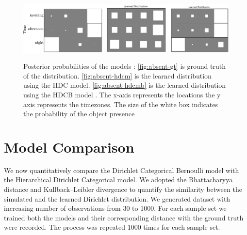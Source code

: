 \begin{figure}
    \centering
    \includegraphics[width=\textwidth]{images/absent_learned.png}
       
    \begin{minipage}[t]{.35\textwidth}
    \label{fig:absent-gt}
    \end{minipage}%
    \begin{minipage}[t]{.3\textwidth}
    \label{fig:absent-hdcm}
    \end{minipage}
    \begin{minipage}[t]{.25\textwidth}
    \label{fig:absent-hdcmb}
    \end{minipage}

\caption[Posterior probabilities of HDC and HDCB ]{Posterior probabilities of the models : \ref{fig:absent-gt} is ground truth of the distribution. \ref{fig:absent-hdcm} is the learned distribution using the HDC model. \ref{fig:absent-hdcmb} is the learned distribution using the HDCB  model . The x-axis represents the locations the y axis represents the timezones. The size of the white box indicates the probability of the object presence }\label{fig:absent-eval}
    
\end{figure}


\section{Model Comparison}

We now quantitatively compare the Dirichlet Categorical Bernoulli model with the Hierarchical Dirichlet Categorical model. We adopted  the Bhattacharyya distance \cite{bhattacharyya1946measure} and Kullback–Leibler divergence \cite{kullback1951information} to quantify the similarity between the simulated and the learned Dirichlet  distribution. 
We generated dataset with increasing number of observations from 30 to 1000. For each sample set we trained both the models and their corresponding distance with the ground truth were recorded. The process was repeated 1000 times for each sample set.



